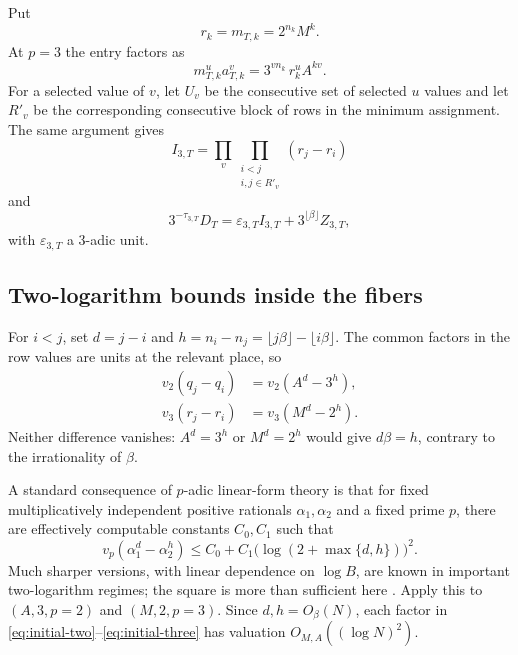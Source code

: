 \documentclass[11pt,oneside]{article}
\theoremstyle{definition}
\theoremstyle{remark}
\begin{document}
Put
\begin{equation}\label{eq:three-unit-input}
 r_k=m_{T,k}=2^{n_k}M^k.
\end{equation}
At $p=3$ the entry factors as
\[
 m_{T,k}^ua_{T,k}^v
 =3^{vn_k}\,r_k^uA^{kv}.
\]
For a selected value of $v$, let $U_v$ be the consecutive set of selected $u$ values and let
$R'_v$ be the corresponding consecutive block of rows in the minimum assignment.  The same
argument gives
\begin{equation}\label{eq:initial-three}
 I_{3,T}
 =\prod_v\prod_{\substack{i<j\\i,j\in R'_v}}(r_j-r_i)
\end{equation}
and
\begin{equation}\label{eq:three-layer-expansion}
3^{-\tau_{3,T}}D_T
 =\varepsilon_{3,T}I_{3,T}+3^{\lfloor\beta\rfloor}Z_{3,T},
\end{equation}
with $\varepsilon_{3,T}$ a $3$-adic unit.

\subsection{Two-logarithm bounds inside the fibers}

For $i<j$, set $d=j-i$ and
$h=n_i-n_j=\lfloor j\beta\rfloor-\lfloor i\beta\rfloor$.  The common factors in the row
values are units at the relevant place, so
\begin{align}
 v_2(q_j-q_i)&=v_2(A^d-3^h), \label{eq:qdiff-two}\\
 v_3(r_j-r_i)&=v_3(M^d-2^h). \label{eq:rdiff-three}
\end{align}
Neither difference vanishes: $A^d=3^h$ or $M^d=2^h$ would give $d\beta=h$, contrary to the
irrationality of $\beta$.

A standard consequence of $p$-adic linear-form theory is that for fixed multiplicatively
independent positive rationals $\alpha_1,\alpha_2$ and a fixed prime $p$, there are effectively
computable constants $C_0,C_1$ such that
\begin{equation}\label{eq:padic-two-log}
 v_p(\alpha_1^d-\alpha_2^h)
 \le C_0+C_1\bigl(\log(2+\max\{d,h\})\bigr)^2.
\end{equation}
Much sharper versions, with linear dependence on $\log B$, are known in important two-logarithm
regimes; the square is more than sufficient here
\cite{BugeaudLaurent1996,Bugeaud2002,Yu1998}.  Apply this to $(A,3,p=2)$ and
$(M,2,p=3)$.  Since $d,h=O_\beta(N)$, each factor in
\eqref{eq:initial-two}--\eqref{eq:initial-three} has valuation
$O_{M,A}((\log N)^2)$.
\end{document}
